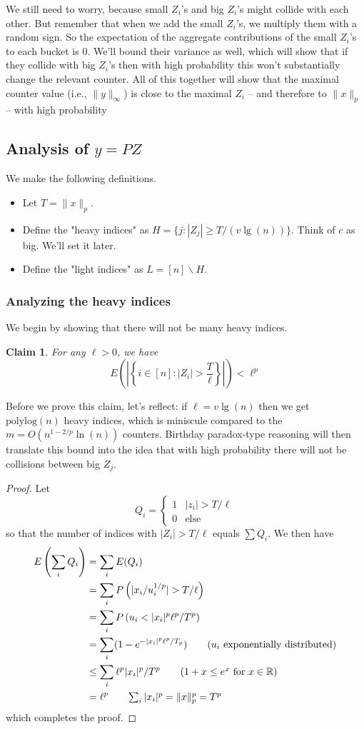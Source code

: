 \documentclass[11pt]{article}
\newtheorem{claim}{Claim}
\newcommand{\R}{\mathbb{R}}
\begin{document}
We still need to worry, because small $Z_i$'s and big $Z_i$'s might collide with each other. But remember that when we add the small $Z_i$'s, we multiply them with a random sign. So the expectation of the aggregate contributions of the small $Z_i$'s to each bucket is 0. We'll bound their variance as well, which will show that if they collide with big $Z_i$'s then with high probability this won't substantially change the relevant counter. All of this together will show that the maximal counter value (i.e., $\|y\|_\infty$) is close to the maximal $Z_i$ \--- and therefore to $\|x\|_p$ \--- with high probability


\subsection{Analysis of $y= PZ$}
We make the following definitions.
\begin{itemize}
\item
Let $T = \|x\|_p$.
\item
Define the "heavy indices" as $H = \{j : |Z_j| \geq T / (v \lg(n))\}$. Think of $c$ as big. We'll set it later.
\item
Define the "light indices" as $L = [n] \backslash H$.
\end{itemize}

\subsubsection{Analyzing the heavy indices}
We begin by showing that there will not be many heavy indices.
\begin{claim}
For any $\ell > 0$, we have
\[
E \left( \left| \left\{ i \in [n] : |Z_i| > \frac{T}{\ell} \right\} \right| \right) < \ell^p
\]
\end{claim}
Before we prove this claim, let's reflect: if $\ell = v \lg(n)$ then we get $\text{polylog}(n)$ heavy indices, which is miniscule compared to the $m = O(n^{1-2/p} \ln(n))$ counters. Birthday paradox-type reasoning will then translate this bound into the idea that with high probability there will not be collisions between big $Z_j$.
\begin{proof}
Let
\[
Q_i = \begin{cases}
1&|z_i| > T/\ell \\
0&\text{else}
\end{cases}
\]
so that the number of indices with $|Z_i| > T/\ell$ equals $\sum Q_i$. We then have
\begin{align*}
E\left(\sum_i Q_i \right) &= \sum_i E(Q_i)\\
	&= \sum_i P\left(|x_i / u_i^{1/p}| > T/\ell \right) \\
	&= \sum_i P\left(u_i < |x_i|^p \ell^p / T^p \right) \\
	&= \sum_i (1 - e^{-|x_i|^p \ell^p / T_p})  	\tag*{($u_i$ exponentially distributed)}\\
	&\leq \sum_i \ell^p |x_i|^p / T^p				\tag*{($1+x \leq e^x$ for $x \in \R$)} \\
	&= \ell^p								\tag*{$\sum_i |x_i|^p = \|x\|_p^p = T^p$}
\end{align*}
which completes the proof.
\end{proof}
\end{document}
